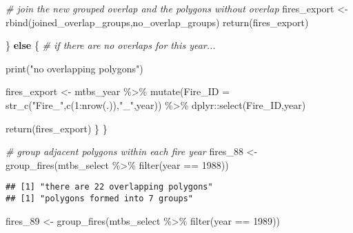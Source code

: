 \documentclass[
]{book}
\newenvironment{Shaded}{\begin{snugshade}}{\end{snugshade}}
\newcommand{\AttributeTok}[1]{\textcolor[rgb]{0.77,0.63,0.00}{#1}}
\newcommand{\CommentTok}[1]{\textcolor[rgb]{0.56,0.35,0.01}{\textit{#1}}}
\newcommand{\ControlFlowTok}[1]{\textcolor[rgb]{0.13,0.29,0.53}{\textbf{#1}}}
\newcommand{\DecValTok}[1]{\textcolor[rgb]{0.00,0.00,0.81}{#1}}
\newcommand{\FunctionTok}[1]{\textcolor[rgb]{0.00,0.00,0.00}{#1}}
\newcommand{\NormalTok}[1]{#1}
\newcommand{\OtherTok}[1]{\textcolor[rgb]{0.56,0.35,0.01}{#1}}
\newcommand{\SpecialCharTok}[1]{\textcolor[rgb]{0.00,0.00,0.00}{#1}}
\newcommand{\StringTok}[1]{\textcolor[rgb]{0.31,0.60,0.02}{#1}}
\begin{document}
\begin{Shaded}
\begin{Highlighting}[]
    \CommentTok{\# join the new grouped overlap and the polygons without overlap}
\NormalTok{    fires\_export }\OtherTok{\textless{}{-}} \FunctionTok{rbind}\NormalTok{(joined\_overlap\_groups,no\_overlap\_groups)}
    \FunctionTok{return}\NormalTok{(fires\_export)}
    
\NormalTok{    \} }\ControlFlowTok{else}\NormalTok{ \{ }\CommentTok{\# if there are no overlaps for this year...}
      
      \FunctionTok{print}\NormalTok{(}\StringTok{"no overlapping polygons"}\NormalTok{)}
      
\NormalTok{      fires\_export }\OtherTok{\textless{}{-}}\NormalTok{ mtbs\_year }\SpecialCharTok{\%\textgreater{}\%}
        \FunctionTok{mutate}\NormalTok{(}\AttributeTok{Fire\_ID =} \FunctionTok{str\_c}\NormalTok{(}\StringTok{"Fire\_"}\NormalTok{,}\FunctionTok{c}\NormalTok{(}\DecValTok{1}\SpecialCharTok{:}\FunctionTok{nrow}\NormalTok{(.)),}\StringTok{"\_"}\NormalTok{,year)) }\SpecialCharTok{\%\textgreater{}\%}
\NormalTok{        dplyr}\SpecialCharTok{::}\FunctionTok{select}\NormalTok{(Fire\_ID,year)}
      
      \FunctionTok{return}\NormalTok{(fires\_export)}
\NormalTok{  \}}
\NormalTok{\}}
\end{Highlighting}
\end{Shaded}

\begin{Shaded}
\begin{Highlighting}[]
\CommentTok{\# group adjacent polygons within each fire year}
\NormalTok{fires\_88 }\OtherTok{\textless{}{-}} \FunctionTok{group\_fires}\NormalTok{(mtbs\_select }\SpecialCharTok{\%\textgreater{}\%}  \FunctionTok{filter}\NormalTok{(year }\SpecialCharTok{==} \DecValTok{1988}\NormalTok{))}
\end{Highlighting}
\end{Shaded}

\begin{verbatim}
## [1] "there are 22 overlapping polygons"
## [1] "polygons formed into 7 groups"
\end{verbatim}

\begin{Shaded}
\begin{Highlighting}[]
\NormalTok{fires\_89 }\OtherTok{\textless{}{-}} \FunctionTok{group\_fires}\NormalTok{(mtbs\_select }\SpecialCharTok{\%\textgreater{}\%}  \FunctionTok{filter}\NormalTok{(year }\SpecialCharTok{==} \DecValTok{1989}\NormalTok{))}
\end{Highlighting}
\end{Shaded}
\end{document}

